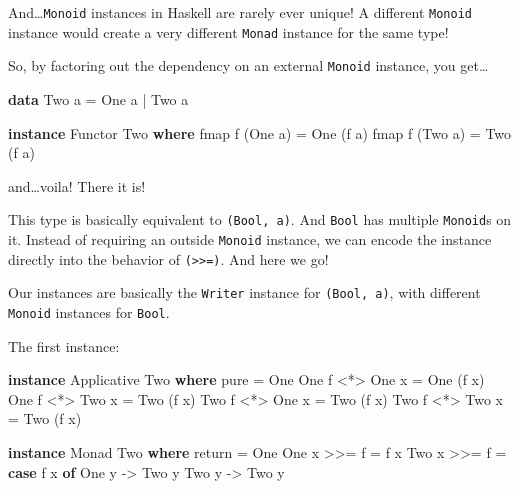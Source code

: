 \documentclass[]{article}
\newenvironment{Shaded}{}{}
\newcommand{\KeywordTok}[1]{\textcolor[rgb]{0.00,0.44,0.13}{\textbf{{#1}}}}
\newcommand{\DataTypeTok}[1]{\textcolor[rgb]{0.56,0.13,0.00}{{#1}}}
\newcommand{\OtherTok}[1]{\textcolor[rgb]{0.00,0.44,0.13}{{#1}}}
\newcommand{\FunctionTok}[1]{\textcolor[rgb]{0.02,0.16,0.49}{{#1}}}
\newcommand{\NormalTok}[1]{{#1}}
\begin{document}
And\ldots{}\texttt{Monoid} instances in Haskell are rarely ever unique!
A different \texttt{Monoid} instance would create a very different
\texttt{Monad} instance for the same type!

So, by factoring out the dependency on an external \texttt{Monoid}
instance, you get\ldots{}

\begin{Shaded}
\begin{Highlighting}[]
\KeywordTok{data} \DataTypeTok{Two} \NormalTok{a }\FunctionTok{=} \DataTypeTok{One} \NormalTok{a }\FunctionTok{|} \DataTypeTok{Two} \NormalTok{a}

\KeywordTok{instance} \DataTypeTok{Functor} \DataTypeTok{Two} \KeywordTok{where}
    \NormalTok{fmap f (}\DataTypeTok{One} \NormalTok{a) }\FunctionTok{=} \DataTypeTok{One} \NormalTok{(f a)}
    \NormalTok{fmap f (}\DataTypeTok{Two} \NormalTok{a) }\FunctionTok{=} \DataTypeTok{Two} \NormalTok{(f a)}
\end{Highlighting}
\end{Shaded}

and\ldots{}voila! There it is!

This type is basically equivalent to \texttt{(Bool,\ a)}. And
\texttt{Bool} has multiple \texttt{Monoid}s on it. Instead of requiring
an outside \texttt{Monoid} instance, we can encode the instance directly
into the behavior of \texttt{(\textgreater{}\textgreater{}=)}. And here
we go!

Our instances are basically the \texttt{Writer} instance for
\texttt{(Bool,\ a)}, with different \texttt{Monoid} instances for
\texttt{Bool}.

The first instance:

\begin{Shaded}
\begin{Highlighting}[]
\KeywordTok{instance} \DataTypeTok{Applicative} \DataTypeTok{Two} \KeywordTok{where}
    \NormalTok{pure }\FunctionTok{=} \DataTypeTok{One}
    \DataTypeTok{One} \NormalTok{f }\FunctionTok{<*>} \DataTypeTok{One} \NormalTok{x }\FunctionTok{=} \DataTypeTok{One} \NormalTok{(f x)}
    \DataTypeTok{One} \NormalTok{f }\FunctionTok{<*>} \DataTypeTok{Two} \NormalTok{x }\FunctionTok{=} \DataTypeTok{Two} \NormalTok{(f x)}
    \DataTypeTok{Two} \NormalTok{f }\FunctionTok{<*>} \DataTypeTok{One} \NormalTok{x }\FunctionTok{=} \DataTypeTok{Two} \NormalTok{(f x)}
    \DataTypeTok{Two} \NormalTok{f }\FunctionTok{<*>} \DataTypeTok{Two} \NormalTok{x }\FunctionTok{=} \DataTypeTok{Two} \NormalTok{(f x)}

\KeywordTok{instance} \DataTypeTok{Monad} \DataTypeTok{Two} \KeywordTok{where}
    \NormalTok{return }\FunctionTok{=} \DataTypeTok{One}
    \DataTypeTok{One} \NormalTok{x }\FunctionTok{>>=} \NormalTok{f }\FunctionTok{=} \NormalTok{f x}
    \DataTypeTok{Two} \NormalTok{x }\FunctionTok{>>=} \NormalTok{f }\FunctionTok{=} \KeywordTok{case} \NormalTok{f x }\KeywordTok{of}
                    \DataTypeTok{One} \NormalTok{y }\OtherTok{->} \DataTypeTok{Two} \NormalTok{y}
                    \DataTypeTok{Two} \NormalTok{y }\OtherTok{->} \DataTypeTok{Two} \NormalTok{y}
\end{Highlighting}
\end{Shaded}
\end{document}

